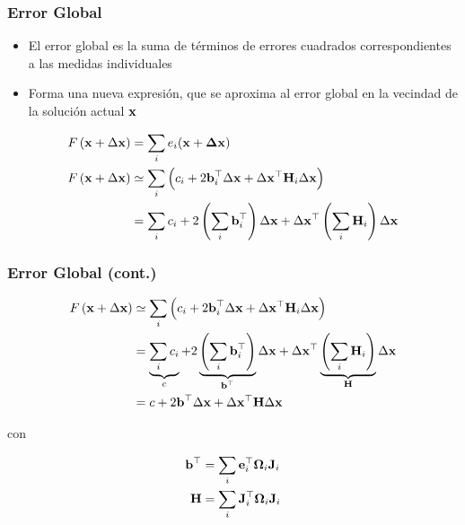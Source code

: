 \begin{frame}
    \frametitle{Error Global}
    
    \begin{itemize}
        \item El error global es la suma de términos de errores cuadrados correspondientes a las medidas individuales
        \item Forma una nueva expresión, que se aproxima al error global en la vecindad de la solución actual $\boldsymbol{\mathbf{x}}$
    \end{itemize}
    
    \begin{align*}
        F\left(\boldsymbol{\mathbf{x}} + \Delta \boldsymbol{\mathbf{x}} \right) &= \sum_{i} e_{i}(\boldsymbol{\mathbf{x}} + \boldsymbol{\mathbf{\Delta}}\boldsymbol{\mathbf{x}})\\
        F\left(\boldsymbol{\mathbf{x}} + \Delta \boldsymbol{\mathbf{x}} \right) &\simeq \sum_{i} \left( c_{i} + 2 \boldsymbol{\mathbf{b}}^{\top}_{i} \Delta \boldsymbol{\mathbf{x}} + \Delta \boldsymbol{\mathbf{x}}^{\top} \boldsymbol{\mathbf{H}}_{i} \Delta \boldsymbol{\mathbf{x}} \right) \\
        &= \sum_{i} c_{i} + 2 \left( \sum_{i} \boldsymbol{\mathbf{b}}^{\top}_{i} \right) \Delta \boldsymbol{\mathbf{x}} + \Delta \boldsymbol{\mathbf{x}}^{\top} \left( \sum_{i} \boldsymbol{\mathbf{H}}_{i} \right) \Delta \boldsymbol{\mathbf{x}}
    \end{align*}
    
    
\end{frame}

\begin{frame}
    \frametitle{Error Global (cont.)}
    
    \begin{align*}
        F\left(\boldsymbol{\mathbf{x}} + \Delta \boldsymbol{\mathbf{x}} \right) &\simeq \sum_{i} \left( c_{i} + 2 \boldsymbol{\mathbf{b}}^{\top}_{i} \Delta \boldsymbol{\mathbf{x}} + \Delta \boldsymbol{\mathbf{x}}^{\top} \boldsymbol{\mathbf{H}}_{i} \Delta \boldsymbol{\mathbf{x}} \right) \\
        &= \underbrace{\sum_{i} c_{i}}_{c} + 2 \underbrace{\left( \sum_{i} \boldsymbol{\mathbf{b}}^{\top}_{i} \right)}_{\boldsymbol{\mathbf{b}}^{\top}} \Delta \boldsymbol{\mathbf{x}} + \Delta \boldsymbol{\mathbf{x}}^{\top} \underbrace{\left( \sum_{i} \boldsymbol{\mathbf{H}}_{i} \right)}_{\boldsymbol{\mathbf{H}}} \Delta \boldsymbol{\mathbf{x}} \\
        &= c + 2 \boldsymbol{\mathbf{b}}^{\top} \Delta \boldsymbol{\mathbf{x}} + \Delta \boldsymbol{\mathbf{x}}^{\top} \boldsymbol{\mathbf{H}} \Delta \boldsymbol{\mathbf{x}}
    \end{align*}
    
    con
    
    \begin{align*}
        \boldsymbol{\mathbf{b}}^{\top} &= \sum_{i} \boldsymbol{\mathbf{e}}_{i}^{\top} \boldsymbol{\mathbf{\Omega}}_{i} \boldsymbol{\mathbf{J}}_{i} \\ 
        \boldsymbol{\mathbf{H}} &= \sum_{i}  \boldsymbol{\mathbf{J}}_{i}^{\top} \boldsymbol{\mathbf{\Omega}}_{i} \boldsymbol{\mathbf{J}}_{i}
    \end{align*}
    
    
\end{frame}

